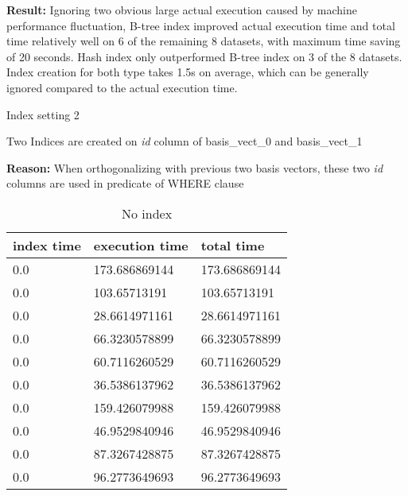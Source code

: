 \begin{itemize*}
\par \textbf{Result:} Ignoring two obvious large actual execution caused by machine performance fluctuation, B-tree index improved actual execution time and total time relatively well on 6 of the remaining 8 datasets, with maximum time saving of 20 seconds. Hash index only outperformed B-tree index on 3 of the 8 datasets. Index creation for both type takes 1.5s on average, which can be generally ignored compared to the actual execution time.
\item{Index setting 2}
\par Two Indices are created on \textit{id} column of basis\_vect\_0 and basis\_vect\_1
\par \textbf{Reason:} When orthogonalizing with previous two basis vectors, these two \textit{id} columns are used in predicate of WHERE clause

\begin{table}[H]
\begin{center}
\begin{tabular}{|l|l|l|}
\hline
index time & execution time & total time     \\ \hline
0.0 & 173.686869144 & 173.686869144 \\ \hline
0.0 & 103.65713191 & 103.65713191 \\ \hline
0.0 & 28.6614971161 & 28.6614971161 \\ \hline
0.0 & 66.3230578899 & 66.3230578899 \\ \hline
0.0 & 60.7116260529 & 60.7116260529 \\ \hline
0.0 & 36.5386137962 & 36.5386137962 \\ \hline
0.0 & 159.426079988 & 159.426079988 \\ \hline
0.0 & 46.9529840946 & 46.9529840946 \\ \hline
0.0 & 87.3267428875 & 87.3267428875 \\ \hline
0.0 & 96.2773649693 & 96.2773649693 \\ \hline
\end{tabular}
\end{center}
\caption{No index}
\end{table}


\end{itemize*}
